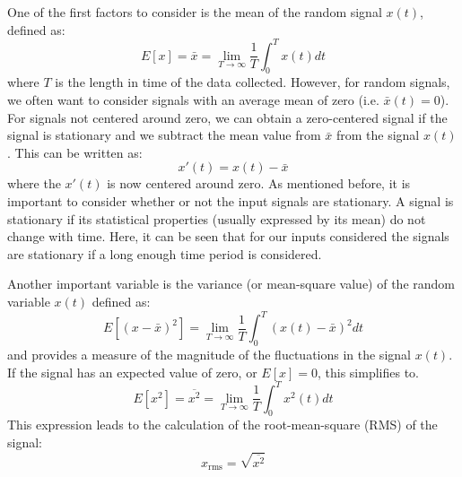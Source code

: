 \documentclass[12pt,letter]{article}
\begin{document}
One of the first factors to consider is the mean of the random signal $x(t)$, defined as:
\begin{equation}
E[x] = \bar{x} = \lim\limits_{T \rightarrow \infty} \frac{1}{T} \int_{0}^{T}x(t)dt
\end{equation}
where $T$ is the length in time of the data collected. However, for random signals, we often want to consider signals with an average mean of zero (i.e. $\bar{x}(t)=0$). For signals not centered around zero, we can obtain a zero-centered signal if the signal is stationary and we subtract the mean value from $\bar{x}$ from the signal $x(t)$. This can be written as:
\begin{equation}
x'(t) = x(t) - \bar{x}
\end{equation} 
where the $x'(t)$ is now centered around zero. As mentioned before, it is important to consider whether or not the input signals are stationary. A signal is stationary if its statistical properties (usually expressed by its mean) do not change with time. Here, it can be seen that for our inputs considered the signals are stationary if a long enough time period is considered. 

Another important variable is the variance (or mean-square value) of the random variable $x(t)$ defined as:
\begin{equation}
E[(x-\bar{x})^2] = \lim\limits_{T \rightarrow \infty} \frac{1}{T} \int_{0}^{T}(x(t)-\bar{x})^2dt
\end{equation}
and provides a measure of the magnitude of the fluctuations in the signal $x(t)$. If the signal has an expected value of zero, or $E[x]=0$, this simplifies to. 
\begin{equation}
E[x^2] = \overline{x^2} = \lim\limits_{T \rightarrow \infty} \frac{1}{T} \int_{0}^{T}x^2(t)dt
\end{equation}
This expression leads to the calculation of the root-mean-square (RMS) of the signal:
\begin{equation}
x_\text{rms} = \sqrt{\overline{x^2}} 
\end{equation}
\end{document}

